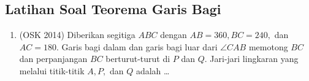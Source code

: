 \subsection{Latihan Soal Teorema Garis Bagi}
\begin{enumerate}
    \item (OSK 2014) Diberikan segitiga $ABC$ dengan $AB = 360, BC = 240,$ dan $AC = 180$. Garis bagi dalam dan garis bagi luar dari $\angle CAB$ memotong $BC$ dan perpanjangan $BC$ berturut-turut di $P$ dan $Q$. Jari-jari lingkaran yang melalui titik-titik $A, P,$ dan $Q$ adalah \dots
\end{enumerate}